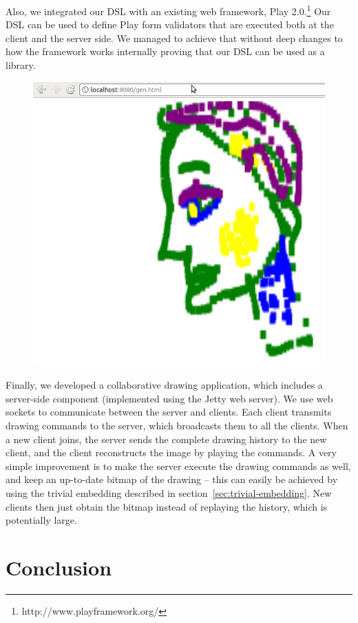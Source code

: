 \documentclass[runningheads,a4paper]{llncs}
\begin{document}
Also, we integrated our DSL with an existing web framework, Play 2.0.\footnote{http://www.playframework.org/}
Our DSL can be used to define Play form validators that are executed both at the client and the server side.
We managed to achieve that without deep changes to how the framework works internally proving that our
DSL can be used as a library.

\begin{figure}
\includegraphics[scale=0.2]{drawing}
\end{figure}
Finally, we developed a collaborative drawing application, which
includes a server-side component (implemented using the Jetty web
server). We use web sockets to communicate between the server and
clients. Each client transmits drawing commands to the server, which
broadcasts them to all the clients. When a new client joins, the
server sends the complete drawing history to the new client, and the
client reconstructs the image by playing the commands. A very
simple improvement is to make the server execute the drawing
commands as well, and keep an up-to-date bitmap of the drawing -- this
can easily be achieved by using the trivial embedding described in
section~\ref{sec:trivial-embedding}. New clients then just obtain the
bitmap instead of replaying the history, which is potentially large.

\section{Conclusion}\label{sec:conclusion}
\end{document}
